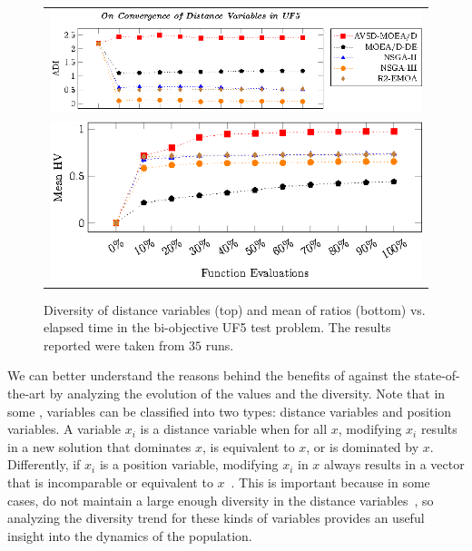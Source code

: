 \begin{figure}[t]
\centering
\begin{tabular}{l}
 \includegraphics[scale=1.15]{images/Diversity_Long_Term_tikz_UF5-figure0.eps}\\[0cm]%
 \includegraphics[scale=1.15]{images/Diversity_Long_Term_tikz_UF5-figure1.eps}\\[0cm]%
\end{tabular}
\caption{Diversity of distance variables (top) and mean of \HV{} ratios (bottom) vs. elapsed time in the bi-objective UF5 test problem. The results reported were taken from $35$ runs.}\label{fig:UF5_Diversity}
\end{figure}

We can better understand the reasons behind the benefits of \AVSDMOEAD{} against the state-of-the-art \MOEAS{}
by analyzing the evolution of the \HV{} values and the diversity.
%
Note that in some \MOPS{}, variables can be classified into two types: 
distance variables and position variables.
%
A variable $x_i$ is a distance variable when for all $x$, modifying $x_i$ results in a new solution 
that dominates $x$, is equivalent to $x$, or is dominated by $x$.
%
Differently, if $x_i$ is a position variable, modifying $x_i$ in $x$ always results in a vector that is 
incomparable or equivalent to $x$~\cite{huband2006review}.
%
This is important because in some cases, \MOEAS{} do not maintain a large enough diversity in the distance
variables~\cite{castillo2017multi}, so analyzing the diversity trend for these kinds of variables provides an useful
insight into the dynamics of the population.

